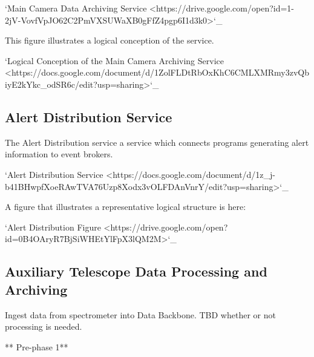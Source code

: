 `Main Camera Data Archiving Service <https://drive.google.com/open?id=1-2jV-VovfVpJO62C2PmVXSUWaXB0gFfZ4pgp6I1d3k0>`_

This figure illustrates a logical conception of the service.

`Logical Conception of the Main Camera Archiving Service  <https://docs.google.com/document/d/1ZolFLDtRbOxKhC6CMLXMRmy3zvQbiyE2kYkc_odSR6c/edit?usp=sharing>`_


\subsection{Alert Distribution Service}

The Alert Distribution service a service which connects programs
generating alert information to event brokers.

`Alert Distribution Service <https://docs.google.com/document/d/1z_j-b41BHwpfXoeRAwTVA76Uzp8Xodx3vOLFDAnVnrY/edit?usp=sharing>`_

A figure that illustrates a representative logical structure is here:

`Alert Distribution Figure <https://drive.google.com/open?id=0B4OAryR7BjSiWHEtYlFpX3lQM2M>`_

\subsection{Auxiliary Telescope  Data Processing and Archiving}

Ingest data from spectrometer into Data Backbone.
TBD whether or not processing is needed.

** Pre-phase 1**

